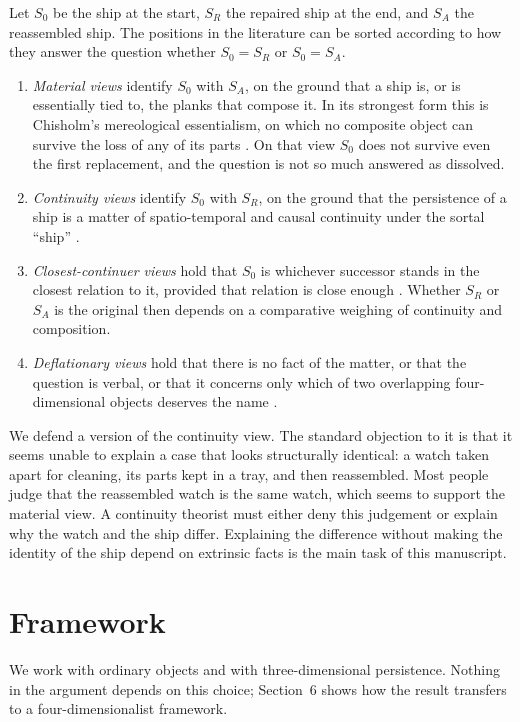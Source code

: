 \documentclass{situationist-preprint}
\begin{document}
Let $S_0$ be the ship at the start, $S_R$ the repaired ship at the end, and $S_A$ the reassembled ship. The positions in the literature can be sorted according to how they answer the question whether $S_0 = S_R$ or $S_0 = S_A$.
\begin{enumerate}[label=(\roman*)]
\item \emph{Material views} identify $S_0$ with $S_A$, on the ground that a ship is, or is essentially tied to, the planks that compose it. In its strongest form this is Chisholm's mereological essentialism, on which no composite object can survive the loss of any of its parts \citep{Chisholm}. On that view $S_0$ does not survive even the first replacement, and the question is not so much answered as dissolved.
\item \emph{Continuity views} identify $S_0$ with $S_R$, on the ground that the persistence of a ship is a matter of spatio-temporal and causal continuity under the sortal \enquote{ship} \citep{Wiggins1980,Wiggins2001}.
\item \emph{Closest-continuer views} hold that $S_0$ is whichever successor stands in the closest relation to it, provided that relation is close enough \citep{Nozick}. Whether $S_R$ or $S_A$ is the original then depends on a comparative weighing of continuity and composition.
\item \emph{Deflationary views} hold that there is no fact of the matter, or that the question is verbal, or that it concerns only which of two overlapping four-dimensional objects deserves the name \citep{Lewis1976,Sider2001}.
\end{enumerate}

We defend a version of the continuity view. The standard objection to it is that it seems unable to explain a case that looks structurally identical: a watch taken apart for cleaning, its parts kept in a tray, and then reassembled. Most people judge that the reassembled watch is the same watch, which seems to support the material view. A continuity theorist must either deny this judgement or explain why the watch and the ship differ. Explaining the difference without making the identity of the ship depend on extrinsic facts is the main task of this manuscript.

\section{Framework}

We work with ordinary objects and with three-dimensional persistence. Nothing in the argument depends on this choice; Section~6 shows how the result transfers to a four-dimensionalist framework.
\end{document}
